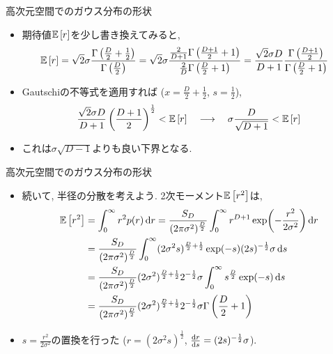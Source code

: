 \documentclass[dvipdfmx,notheorems,t]{beamer}
\begin{document}
\begin{frame}{高次元空間でのガウス分布の形状}
\begin{itemize}
  \item 期待値$\operatorname{\mathbb{E}} \left[ r \right]$を少し書き換えてみると,
  \begin{align*}
    \operatorname{\mathbb{E}} \left[ r \right] &= \sqrt{2} \sigma \frac{\Gamma \left( \frac{D}{2} + \frac{1}{2} \right)}{\Gamma \left( \frac{D}{2} \right)}
      = \sqrt{2} \sigma \frac{\frac{2}{D + 1} \Gamma \left( \frac{D + 1}{2} + 1 \right)}{
        \frac{2}{D} \Gamma \left( \frac{D}{2} + 1 \right)}
      = \frac{\sqrt{2} \sigma D}{D + 1} \frac{\Gamma \left( \frac{D + 1}{2} \right)}{\Gamma \left( \frac{D}{2} + 1 \right)}
  \end{align*}

  \item Gautschiの不等式を適用すれば ($x = \frac{D}{2} + \frac{1}{2}$, $s = \frac{1}{2}$),
  \begin{align*}
    \frac{\sqrt{2} \sigma D}{D + 1} \left( \frac{D + 1}{2} \right)^\frac{1}{2} < \operatorname{\mathbb{E}} \left[ r \right] \quad
    \longrightarrow \quad \sigma \frac{D}{\sqrt{D + 1}} < \operatorname{\mathbb{E}} \left[ r \right]
  \end{align*}

  \item これは$\sigma \sqrt{D - 1}$よりも良い下界となる.
\end{itemize}
\end{frame}

\begin{frame}{高次元空間でのガウス分布の形状}
\begin{itemize}
  \item 続いて, 半径の分散を考えよう. 2次モーメント$\operatorname{\mathbb{E}} \left[ r^2 \right]$は,
  \begin{align*}
    \operatorname{\mathbb{E}} \left[ r^2 \right] &= \int_0^\infty r^2 p(r) \dd{r}
      = \frac{S_D}{(2\pi \sigma^2)^\frac{D}{2}}
        \int_0^\infty r^{D + 1} \exp(-\frac{r^2}{2 \sigma^2}) \dd{r} \\
      &= \frac{S_D}{(2\pi \sigma^2)^\frac{D}{2}}
        \int_0^\infty (2\sigma^2 s)^{\frac{D}{2} + \frac{1}{2}} \exp(-s) (2s)^{-\frac{1}{2}} \sigma \dd{s} \\
      &= \frac{S_D}{(2\pi \sigma^2)^\frac{D}{2}}
        (2\sigma^2)^{\frac{D}{2} + \frac{1}{2}} 2^{-\frac{1}{2}} \sigma
        \int_0^\infty s^{\frac{D}{2}} \exp(-s) \dd{s} \\
      &= \frac{S_D}{(2\pi \sigma^2)^\frac{D}{2}}
        (2\sigma^2)^{\frac{D}{2} + \frac{1}{2}} 2^{-\frac{1}{2}} \sigma
        \Gamma \left( \frac{D}{2} + 1 \right)
  \end{align*}

  \item $s = \frac{r^2}{2 \sigma^2}$の置換を行った
  ($r = (2\sigma^2 s)^\frac{1}{2}$, $\dv{r}{s} = (2s)^{-\frac{1}{2}} \sigma$).
\end{itemize}
\end{frame}
\end{document}
